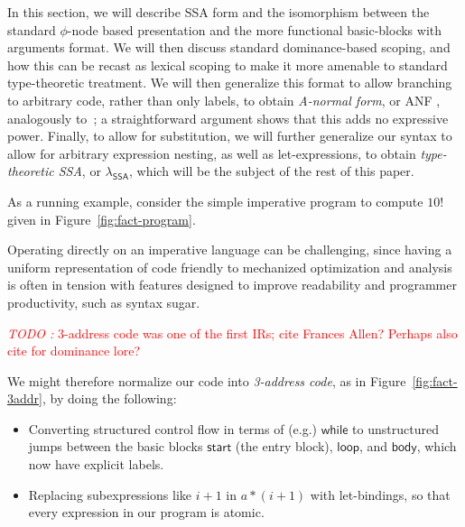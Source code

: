 \documentclass[acmsmall,screen,review]{acmart}
\newcounter{todos}
\newcommand{\TODO}[1]{{
  \stepcounter{todos}
  \begin{center}\large{\textcolor{red}{\emph{TODO \arabic{todos}:} #1}}\end{center}
}}
\newcommand{\ms}[1]{\ensuremath{\mathsf{#1}}}
\newcommand{\isotopessa}{\(\lambda_{\ms{SSA}}\)}
\begin{document}
In this section, we will describe SSA form and the isomorphism between the standard $\phi$-node
based presentation and the more functional basic-blocks with arguments format. We will then discuss
standard dominance-based scoping, and how this can be recast as lexical scoping to make it more
amenable to standard type-theoretic treatment. We will then generalize this format to allow
branching to arbitrary code, rather than only labels, to obtain \textit{A-normal form}, or ANF
\cite{flanagan-93-anf}, analogously to~\citet{chakravarty-functional-ssa-2003}; a straightforward
argument shows that this adds no expressive power. Finally, to allow for substitution, we will
further generalize our syntax to allow for arbitrary expression nesting, as well as let-expressions,
to obtain \textit{type-theoretic SSA}, or \isotopessa{}, which will be the subject of the rest of this
paper.

As a running example, consider the simple imperative program to compute $10!$ given in
Figure~\ref{fig:fact-program}. 

Operating directly on an imperative language can be challenging, since having a uniform
representation of code friendly to mechanized optimization and analysis is often in tension with
features designed to improve readability and programmer productivity, such as syntax sugar. 


\TODO{3-address code was one of the first IRs; cite Frances Allen? Perhaps also cite
\cite{allen-70-cfa} for dominance lore?}

We might therefore normalize our code into \textit{3-address code}, as in
Figure~\ref{fig:fact-3addr}, by doing the following:
\begin{itemize}
  \item Converting structured control flow in terms of (e.g.) \ms{while} to unstructured jumps
  between the basic blocks \ms{start} (the entry block), \ms{loop}, and \ms{body}, which now have
  explicit labels. 
  \item Replacing subexpressions like $i + 1$ in $a * (i + 1)$ with let-bindings, so that every
  expression in our program is atomic. 
\end{itemize}
\end{document}
